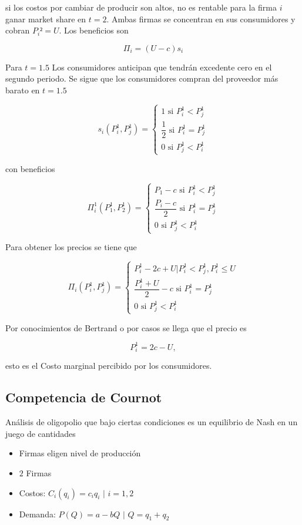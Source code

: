 \documentclass[letterpaper,12pt,twocolumn]{report}
\begin{document}
si los costos por cambiar de producir son altos, no es rentable para la firma $i$ ganar market share en $t=2$. Ambas firmas se concentran en sus consumidores y cobran $P_i² = U.$ Los beneficios son

$$\Pi_i=(U-c)s_i$$

Para $t=1.5$ Los consumidores anticipan que tendrán excedente cero en el segundo periodo. Se sigue que los consumidores compran del proveedor más barato en $t=1.5$

$$s_i(P_i^1,P_j^1)= \begin{cases}
	1 \text{ si } P_i^1<P_j^1\\
	\dfrac{1}{2} \text{ si } P_i^1=P_j^1\\
	0 \text{ si } P_j^1<P_i^1
\end{cases} $$

con beneficios

$$ \Pi_i^1 (P_1^1,P_2^1)= \begin{cases}
	P_1-c \text{ si } P_i^1<P_j^1\\
	\dfrac{P_i-c}{2} \text{ si } P_i^1=P_j^1\\
	0 \text{ si } P_j^1<P_i^1
\end{cases} $$

Para obtener los precios se tiene que 

$$\Pi_i(P_i^1,P_j^1)= \begin{cases}
	P_i^1-2c+U | P_i^1<P_j^1, P_i^1\leq U \\
	\dfrac{P_i^1+U}{2}-c \text{ si } P_i^1=P_j^1\\
	0 \text{ si } P_j^1<P_i^1
\end{cases} $$

Por conocimientos de Bertrand o por casos se llega que el precio es

$$P_i^1=2c-U,$$

esto es el Costo marginal percibido por los consumidores.

\subsection*{Competencia de Cournot}

Análisis de oligopolio que bajo ciertas condiciones es un equilibrio de Nash en un juego de cantidades

\begin{tcolorbox}[title= Supuestos]
	\begin{itemize}
		\item Firmas eligen nivel de producción
		\item $2$ Firmas
		\item Costos: $C_i(q_i)=c_iq_i$ $|$ $ i=1,2$
		\item Demanda: $P(Q)= a-bQ$ $|$ $Q=q_1+q_2$
	\end{itemize}
\end{tcolorbox}
\end{document}
